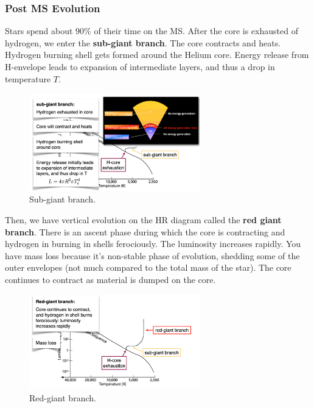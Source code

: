 \documentclass{article}
\begin{document}
\subsubsection{Post MS Evolution}

Stars spend about $90\%$ of their time on the MS. After the core is exhausted of hydrogen, we enter the \textbf{sub-giant branch}. The core contracts and heats. Hydrogen burning shell gets formed around the Helium core. Energy release from H-envelope leads to expansion of intermediate layers, and thus a drop in temperature $T$. 

\begin{figure}
    \centering
    \includegraphics[width=0.66\textwidth]{figs/Screen Shot 2021-09-15 at 9.06.26 AM.png}
    \caption{Sub-giant branch.}
    \label{fig:subgiant}
\end{figure}

Then, we have vertical evolution on the HR diagram called the \textbf{red giant branch}. There is an ascent phase during which the core is contracting and hydrogen in burning in shells ferociously. The luminosity increases rapidly. You have mass loss because it's non-stable phase of evolution, shedding some of the outer envelopes (not much compared to the total mass of the star). The core continues to contract as material is dumped on the core. 

\begin{figure}
    \centering
    \includegraphics[width=0.66\textwidth]{figs/Screen Shot 2021-09-15 at 9.07.02 AM.png}
    \caption{Red-giant branch.}
    \label{fig:red}
\end{figure}
\end{document}
